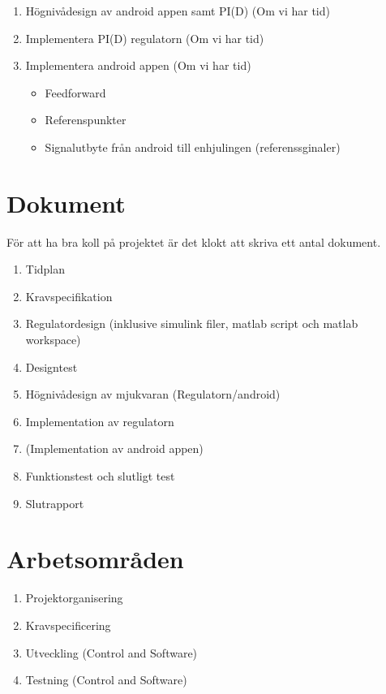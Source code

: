 \documentclass[a4paper]{article}
\begin{document}
\begin{enumerate}
\item Högnivådesign av android appen samt PI(D) (Om vi har tid)

\item Implementera PI(D) regulatorn (Om vi har tid)

\item Implementera android appen (Om vi har tid)
\begin{itemize}
\item Feedforward
\item Referenspunkter
\item Signalutbyte från android till enhjulingen (referenssginaler)
\end{itemize}

\end{enumerate}


\section{Dokument}

För att ha bra koll på projektet är det klokt att skriva ett antal dokument.

\begin{enumerate}

\item Tidplan
\item Kravspecifikation
\item Regulatordesign (inklusive simulink filer, matlab script och matlab workspace)
\item Designtest
\item Högnivådesign av mjukvaran (Regulatorn/android)
\item Implementation av regulatorn
\item (Implementation av android appen)
\item Funktionstest och slutligt test
\item Slutrapport

\end{enumerate}


\section{Arbetsområden}

\begin{enumerate}

\item Projektorganisering
\item Kravspecificering
\item Utveckling (Control and Software)
\item Testning (Control and Software)


\end{enumerate}
\end{document}
